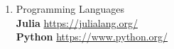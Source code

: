 \begin{enumerate}[label=\Alph*]
\item Programming Languages \\
\textbf{Julia} \url{https://julialang.org/} \\
\textbf{Python} \url{https://www.python.org/}

\end{enumerate}